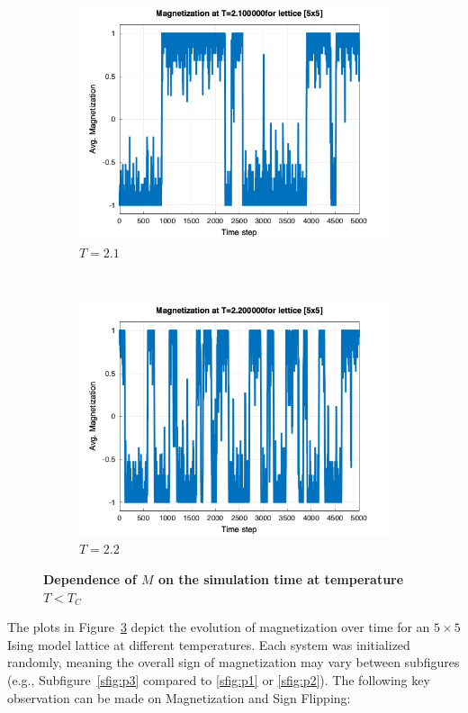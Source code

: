 \begin{figure}[t]
\begin{subfigure}{0.5\textwidth}
		\includegraphics[width=\textwidth]{./img/mag_time_2.100000_5.png}
		\caption{$T=2.1$}
		\label{sfig:p5}
	\end{subfigure}%
	~
	\begin{subfigure}{0.5\textwidth}
		\includegraphics[width=\textwidth]{./img/mag_time_2.200000_5.png}
		\caption{$T=2.2$}
		\label{sfig:p6}
	\end{subfigure}%

	\caption{\textbf{Dependence of $M$ on the simulation time at temperature $T < T_C$}
	}
	\label{fig:mag_time}
\end{figure}
The plots in Figure~\ref{fig:mag_time} depict the evolution of magnetization over time for an $5 \times 5$ Ising model lattice at different temperatures. Each system was initialized randomly, meaning the overall sign of magnetization may vary between subfigures (e.g., Subfigure~\ref{sfig:p3} compared to \ref{sfig:p1} or \ref{sfig:p2}).
The following key observation can be made on Magnetization and Sign Flipping:

